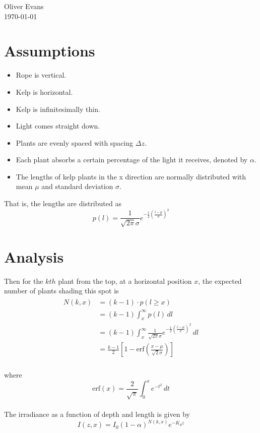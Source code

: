 \documentclass{article}
\begin{document}
\noindent
Oliver Evans \\
\today \\

\noindent
\section{Assumptions}
\begin{itemize}
	\item Rope is vertical.
	\item Kelp is horizontal.
	\item Kelp is infinitesimally thin.
	\item Light comes straight down.
	\item Plants are evenly spaced with spacing $\Delta z$.
	\item Each plant absorbs a certain percentage of the light it receives, denoted by $\alpha$.
	\item The lengths of kelp plants in the x direction are normally distributed with mean $\mu$ and standard deviation $\sigma$.
\end{itemize}

That is, the lengths are distributed as
\begin{equation}
	p(l)=\frac{1}{\sqrt{2\pi}\sigma} e^{-\frac{1}{2}\left(\frac{l-\mu}{\sigma}\right)^2}
\end{equation}

\section{Analysis}
Then for the $kth$ plant from the top, at a horizontal position $x$, the expected number of plants shading this spot is 
\begin{align}
	\begin{split}
	N(k,x)&=(k-1)\cdot p(l\geq x) \\
	&=(k-1)\int_x^\infty p(l)\,dl \\
	&=(k-1)\int_x^\infty\frac{1}{\sqrt{2\pi}\sigma} e^{-\frac{1}{2}\left(\frac{l-\mu}{\sigma}\right)^2} \,dl \\
	&=\frac{k-1}{2}\left[1-\mbox{erf}\left(\frac{x-\mu}{\sqrt{2}\sigma}\right)\right] \\
	\end{split}
\end{align}

where \[\mbox{erf}(x)=\frac{2}{\sqrt\pi}\int_0^xe^{-t^2}\,dt\] \\

The irradiance as a function of depth and length is given by
\begin{equation}
	I(z,x)=I_0(1-\alpha)^{N(k,x)}e^{-K_dz}
\end{equation}
\end{document}
